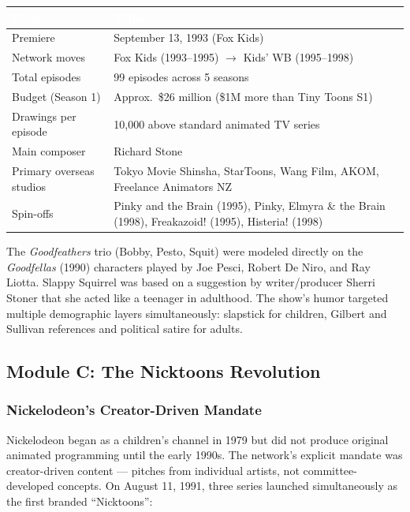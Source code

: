 \documentclass[11pt,letterpaper]{article}
\newcommand{\tableheader}[1]{\textbf{\sffamily\textcolor{white}{#1}}}
\begin{document}
\begin{center}
\begin{tabularx}{\textwidth}{L{4cm}X}
\toprule
{}
\tableheader{Parameter} & \tableheader{Value} \\
\midrule
Premiere & September 13, 1993 (Fox Kids) \\
Network moves & Fox Kids (1993--1995) $\rightarrow$ Kids' WB (1995--1998) \\
Total episodes & 99 episodes across 5 seasons \\
Budget (Season 1) & Approx.\ \$26 million (\$1M more than Tiny Toons S1) \\
Drawings per episode & 10,000 above standard animated TV series \\
Main composer & Richard Stone \\
Primary overseas studios & Tokyo Movie Shinsha, StarToons, Wang Film, AKOM, Freelance Animators NZ \\
Spin-offs & Pinky and the Brain (1995), Pinky, Elmyra \& the Brain (1998), Freakazoid! (1995), Histeria! (1998) \\
\bottomrule
\end{tabularx}
\end{center}

The \textit{Goodfeathers} trio (Bobby, Pesto, Squit) were modeled directly on the \textit{Goodfellas} (1990) characters played by Joe Pesci, Robert De Niro, and Ray Liotta. Slappy Squirrel was based on a suggestion by writer/producer Sherri Stoner that she acted like a teenager in adulthood. The show's humor targeted multiple demographic layers simultaneously: slapstick for children, Gilbert and Sullivan references and political satire for adults.

\subsection{Module C: The Nicktoons Revolution}

\subsubsection{Nickelodeon's Creator-Driven Mandate}

Nickelodeon began as a children's channel in 1979 but did not produce original animated programming until the early 1990s. The network's explicit mandate was creator-driven content --- pitches from individual artists, not committee-developed concepts. On August 11, 1991, three series launched simultaneously as the first branded ``Nicktoons'':
\end{document}
